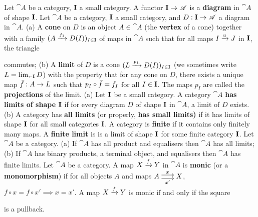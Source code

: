  Let $\cat{A}$ be a category, $\mathbf{I}$ a small category. A functor $\mathbf{I} \to \mathscr{A}$ is a \textbf{diagram} in $\cat A$ of shape $\mathbf{I}$.
 Let $\cat{A}$ be a category, $\mathbf{I}$ a small category, and $D: \mathbf{I} \to \mathscr{A}$ a diagram in $\cat A$. 
(a) A \textbf{cone} on $D$ is an object $A \in \cat A$ (the \textbf{vertex} of a cone) together with a family 
$(A \xrightarrow[]{f_1} D(I))_{I \in \mathbf{I}}$ of maps in $\cat A$ such that for all maps $I \xrightarrow[]{u} J$ in $\mathbf{I}$, the triangle %
 commutes;
(b) A \textbf{limit} of $D$ is a cone $(L \xrightarrow[]{p_1} D(I))_{I \in \mathbf{I}}$ (we sometimes write $L = \lim_{\shortleftarrow \mathbf{I}} D$) with the property that for any cone on $D$, there exists a unique map $\Bar{f}: A \to L$ such that $p_I \circ \Bar{f} = f_I$ for all $I \in \mathbf{I}$. The maps $p_I$ are called the \textbf{projections} of the limit.
(a) Let $\mathbf{I}$ be a small category. A category $\cat A$ \textbf{has limits of shape $\mathbf{I}$} if for every diagram $D$ of shape $\mathbf{I}$ in $\cat A$, a limit of $D$ exists.
(b) A category has \textbf{all limits} (or properly, \textbf{has small limits)} if it has limits of shape $\mathbf{I}$ for all small categories $\mathbf{I}$.
 A category is \textbf{finite} if it contains only finitely many maps. A \textbf{finite limit} is is a limit of shape $\mathbf{I}$ for some finite category $\mathbf{I}$.
 Let $\cat A$ be a category.
(a) If $\cat{A}$ has all product and equalisers then $\cat A$ has all limits;
(b) If $\cat A$ has binary products, a terminal object, and equalisers then $\cat A$ has finite limits.
 Let $\cat A$ be a category. A map $X \xrightarrow[]{f} Y$ in $\cat A$ is \textbf{monic} (or a \textbf{monomorphism}) if for all objects $A$ and maps $A \maps{x}{x'} X$, 
$f \circ x = f \circ x' \implies x = x'$.
 A map $X \xrightarrow[]{f} Y$ is monic if and only if the square %
 is a pullback.
